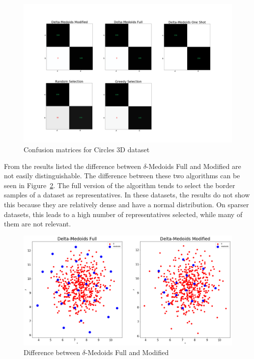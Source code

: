 \documentclass[thesis=B,english]{FITthesis}[2012/10/20]
\begin{document}
\begin{figure}[h]
   \includegraphics[width=\linewidth]{img/exp1_circles.png}
  \caption{Confusion matrices for Circles 3D dataset}
  \label{img:exp1_circles}
\end{figure}

From the results listed the difference between $\delta$-Medoids Full and Modified are not easily distinguishable.
The difference between these two algorithms can be seen in Figure~\ref{img:difference_modified}.
The full version of the algorithm tends to select the border samples of a dataset as representatives.
In these datasets, the results do not show this because they are relatively dense and have a normal distribution.
On sparser datasets, this leads to a high number of representatives selected, while many of them are not relevant. 

\begin{figure}[h]
   \includegraphics[width=\linewidth]{img/delta_medoids_select.png}
  \caption{Difference between $\delta$-Medoids Full and Modified}
  \label{img:difference_modified}
\end{figure}
\end{document}
